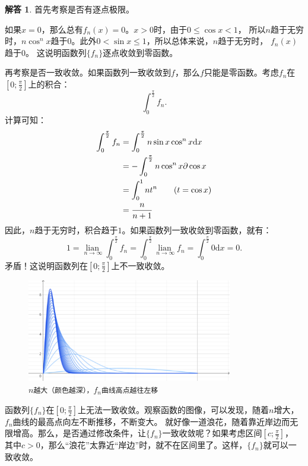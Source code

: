 \documentclass[12pt,UTF8]{ctexbook}
\newcommand{\lian}[1]{
    \underset{#1}{\operatorname{lian}\,}
}
\theoremstyle{definition}
\newtheorem*{so}{解答}
\theoremstyle{plain}
\begin{document}
\begin{so}
    首先考察是否有逐点极限。

    如果$x = 0$，那么总有$f_n(x) = 0$。$x > 0$时，由于$0\leqslant\cos{x}<1$，
    所以$n$趋于无穷时，$n\cos^n{x}$趋于$0$。此外$0 < \sin{x} \leqslant 1$，所以总体来说，$n$趋于无穷时，
    $f_n(x)$趋于$0$。
    这说明函数列$\{f_n\}$逐点收敛到零函数。

    再考察是否一致收敛。如果函数列一致收敛到$f$，那么$f$只能是零函数。考虑$f_n$在$\left[0;\frac{\pi}{2}\right]$上的积合：
    $$ \int_{0}^{\frac{\pi}{2}} f_n.$$
    计算可知：
    \begin{align*}
        \int_{0}^{\frac{\pi}{2}} f_n &= \int_{0}^{\frac{\pi}{2}} n\sin{x}\cos^n{x} \mathrm{d}x \\
        &= -\int_{0}^{\frac{\pi}{2}} n\cos^n{x} \partial \cos{x} \\
        &= \int_{0}^{1} n t^n \tag{$t = \cos{x}$} \\
        &= \frac{n}{n + 1}
    \end{align*}
    因此，$n$趋于无穷时，积合趋于$1$。如果函数列一致收敛到零函数，就有：
    $$ 1 = \lian{n\to\infty} \int_{0}^{\frac{\pi}{2}} f_n = \int_{0}^{\frac{\pi}{2}} \lian{n\to\infty} f_n = \int_{0}^{\frac{\pi}{2}} 0\mathrm{d}x = 0.$$
    矛盾！这说明函数列在$\left[0;\frac{\pi}{2}\right]$上不一致收敛。
\end{so}

\begin{figure}[h] %
    \centering
    \includegraphics[width=0.8\textwidth]{tu/一致收敛1.png}
    \caption*{$n$\texttt{越大（颜色越深），}$f_n$\texttt{曲线高点越往左移}}
\end{figure}

函数列$\{f_n\}$在$\left[0;\frac{\pi}{2}\right]$上无法一致收敛。观察函数的图像，可以发现，随着$n$增大，$f_n$曲线的最高点向左不断推移，不断变大。
就好像一道浪花，随着靠近岸边而无限增高。那么，是否通过修改条件，让$\{f_n\}$一致收敛呢？如果考虑区间$\left[c;\frac{\pi}{2}\right]$，
其中$c>0$，那么“浪花”太靠近“岸边”时，就不在区间里了。这样，$\{f_n\}$就可以一致收敛。
\end{document}
